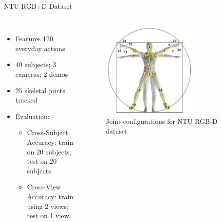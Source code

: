 \documentclass[aspectratio=169, xcolor=dvipsnames]{beamer}
\begin{document}
\begin{frame}{NTU RGB+D Dataset}
      \framesubtitle{}%
      
      \vspace{-0.75cm}
      \begin{columns}
      \begin{itemize}
            \item Features 120 everyday actions
            \item 40 subjects; 3 cameras; 2 demos
            \item 25 skeletal joints tracked
            \item Evaluation:
            \begin{itemize}
                  \item Cross-Subject Accuracy: train on 20 subjects; test on 20 subjects
                  \item Cross-View Accuracy: train using 2 views; test on 1 view
            \end{itemize}
      \end{itemize}
      
      \begin{figure}[ht!]
            \centering
            \includegraphics[width=0.7\textwidth]{images/joint_config.pdf}
            \caption{Joint configurations for NTU RGB-D dataset\footnotemark}
      \end{figure}      
      \end{columns}
\end{frame}
\end{document}

